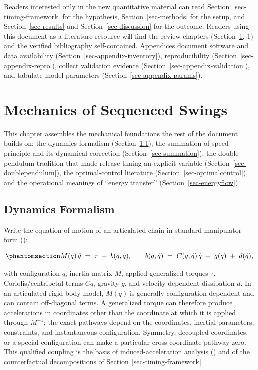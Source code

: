 \documentclass[
  letterpaper,
]{report}
\begin{document}
Readers interested only in the new quantitative material can read
Section~\ref{sec-timing-framework} for the hypothesis,
Section~\ref{sec-methods} for the setup, and Section~\ref{sec-results}
and Section~\ref{sec-discussion} for the outcome. Readers using this
document as a literature resource will find the review chapters
(Section~\ref{sec-mechanics}, 1) and the verified bibliography
self-contained. Appendices document software and data availability
(Section~\ref{sec-appendix-inventory}), reproducibility
(Section~\ref{sec-appendix-repro}), collect validation evidence
(Section~\ref{sec-appendix-validation}), and tabulate model parameters
(Section~\ref{sec-appendix-params}).

\chapter{Mechanics of Sequenced Swings}\label{sec-mechanics}

This chapter assembles the mechanical foundations the rest of the
document builds on: the dynamics formalism
(Section~\ref{sec-formalism}), the summation-of-speed principle and its
dynamical correction (Section~\ref{sec-summation}), the double-pendulum
tradition that made release timing an explicit variable
(Section~\ref{sec-doublependulum}), the optimal-control literature
(Section~\ref{sec-optimalcontrol}), and the operational meanings of
``energy transfer'' (Section~\ref{sec-energyflow}).

\section{Dynamics Formalism}\label{sec-formalism}

Write the equation of motion of an articulated chain in standard
manipulator form ():

\begin{equation}\phantomsection\label{eq-eom}{
M(q)\,\ddot q \;=\; \tau \;-\; b(q, \dot q),
\qquad
b(q,\dot q) \;=\; C(q,\dot q)\,\dot q \;+\; g(q) \;+\; d(\dot q),
}\end{equation}

with configuration \(q\), inertia matrix \(M\), applied generalized
torques \(\tau\), Coriolis/centripetal terms \(C\dot q\), gravity \(g\),
and velocity-dependent dissipation \(d\). In an articulated rigid-body
model, \(M(q)\) is generally configuration dependent and can contain
off-diagonal terms. A generalized torque can therefore produce
accelerations in coordinates other than the coordinate at which it is
applied through \(M^{-1}\); the exact pathways depend on the
coordinates, inertial parameters, constraints, and instantaneous
configuration. Symmetry, decoupled coordinates, or a special
configuration can make a particular cross-coordinate pathway zero. This
qualified coupling is the basis of induced-acceleration analysis
() and of the
counterfactual decompositions of Section~\ref{sec-timing-framework}.
\end{document}

